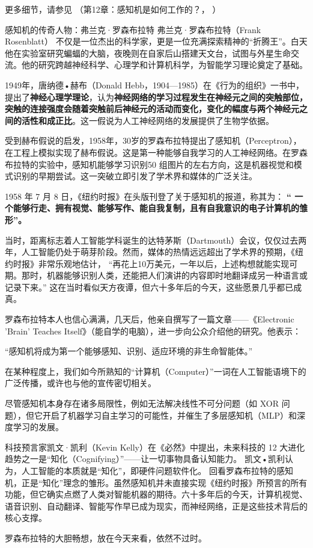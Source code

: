 更多细节，请参见 （第12章：感知机是如何工作的？， \cite{张玉宏2018深度学习之美}）

\begin{story}{感知机的传奇人物：弗兰克·罗森布拉特} 
弗兰克·罗森布拉特（Frank Rosenblatt） 不仅是一位杰出的科学家，更是一位充满探索精神的“折腾王”。白天他在实验室研究蝙蝠的大脑，夜晚则在自家后山搭建天文台，试图与外星生命交流。他的研究跨越神经科学、心理学和计算机科学，为智能学习理论奠定了基础。

1949年，唐纳德•赫布（Donald Hebb，1904—1985）在《行为的组织》一书中，提出了{\bf 神经心理学理论}，认为{\bf 神经网络的学习过程发生在神经元之间的突触部位，突触的连接强度会随着突触前后神经元的活动而变化，变化的幅度与两个神经元之间的活性和成正比}。这一假说为人工神经网络的发展提供了生物学依据。

受到赫布假说的启发，1958年，30岁的罗森布拉特提出了感知机（Perceptron），在工程上模拟实现了赫布假说。这是第一种能够自我学习的人工神经网络。在罗森布拉特的实验中，感知机能够学习识别50 组图片的左右方向，这是机器视觉和模式识别的早期尝试。这一突破立即引发了学术界和媒体的广泛关注。

1958 年 7 月 8 日，《纽约时报》在头版刊登了关于感知机的报道，称其为：
{\bf“ 一个能够行走、拥有视觉、能够写作、能自我复制，且有自我意识的电子计算机的雏形”。}

当时，距离标志着人工智能学科诞生的达特茅斯（Dartmouth）会议，仅仅过去两年，人工智能仍处于萌芽阶段。然而，媒体的热情远远超出了学术界的预期，《纽约时报》非常乐观地估计，
“再花上10万美元，一年以后，上述构想就能实现可期。那时，机器能够识别人类，还能把人们演讲的内容即时地翻译成另一种语言或记录下来。”
这在当时看似天方夜谭，但六十多年后的今天，这些愿景几乎都已成真。

罗森布拉特本人也信心满满，几天后，他亲自撰写了一篇文章——《Electronic 'Brain' Teaches Itself》（能自学的电脑），进一步向公众介绍他的研究。他表示：

“感知机将成为第一个能够感知、识别、适应环境的非生命智能体。”

在某种程度上，我们如今所熟知的“计算机（Computer）”一词在人工智能语境下的广泛传播，或许也与他的宣传密切相关。

尽管感知机本身存在诸多局限性，例如无法解决线性不可分问题（如 XOR 问题），但它开启了机器学习自主学习的可能性，并催生了多层感知机（MLP）和深度学习的发展。

科技预言家凯文·凯利（Kevin Kelly）在《必然》中提出，未来科技的 12 大进化趋势之一是“知化（Cognifying）”——让一切事物具备认知能力。
凯文•凯利认为，人工智能的本质就是“知化”，即硬件问题软件化。
回看罗森布拉特的感知机，正是“知化”理念的雏形。虽然感知机并未直接实现《纽约时报》所预言的所有功能，但它确实点燃了人类对智能机器的期待。六十多年后的今天，计算机视觉、语音识别、自动翻译、智能写作早已成为现实，而神经网络，正是这些技术背后的核心支撑。

罗森布拉特的大胆畅想，放在今天来看，依然不过时。
\end{story}


